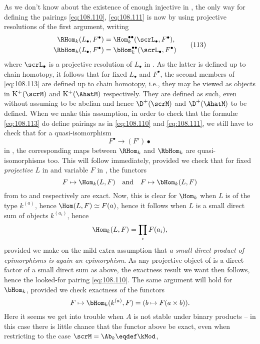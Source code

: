As we don't know about the existence of enough injective
in \AhatM, the only way for defining the pairings \eqref{eq:108.110},
\eqref{eq:108.111} is now by using projective resolutions of the first
argument, writing
\begin{equation}
  \label{eq:108.113}
  \begin{aligned}
    \RHom_k(L_\bullet,F^\bullet) &=
    \Hom_k^{\bullet\bullet}(\scrL_\bullet,F^\bullet), \\
    \RbHom_k(L_\bullet,F^\bullet) &=
    \bHom_k^{\bullet\bullet}(\scrL_\bullet,F^\bullet) 
  \end{aligned}\tag{113}
\end{equation}
where $\scrL_\bullet$ is a projective resolution of $L_\bullet$ in
\Ahatk. As the latter is defined up to chain homotopy, it follows that
for fixed $L_\bullet$ and $F^\bullet$, the second members of
\eqref{eq:108.113} are defined up to chain homotopy, i.e., they may be
viewed as objects in $\mathrm K^+(\scrM)$ and $\mathrm K^+(\AhatM)$
respectively. They are defined as such, even without assuming \scrM{}
to be abelian and hence $\D^+(\scrM)$ and $\D^+(\AhatM)$ to be
defined. When we make this assumption, in order to check that the
formulæ \eqref{eq:108.113} do define pairings as in \eqref{eq:108.110}
and \eqref{eq:108.111}, we still have to check that for a
quasi-isomorphism
\[F^\bullet\to (F')\bullet\]
in \AhatM, the corresponding maps between $\RHom_k$ and $\RbHom_k$ are
quasi-isomorphisms too. This will follow immediately, provided we
check that for fixed \emph{projective} $L$ in \Ahatk{} and variable
$F$ in \AhatM, the functors
\[F\mapsto\Hom_k(L,F)\quad\text{and}\quad
F\mapsto\bHom_k(L,F)\]
from \AhatM{} to \scrM{} and \AhatM{} respectively are exact. Now,
this is clear for $\Hom_k$ when $L$ is of the type $k^{(a)}$, hence
$\Hom(L,F)\simeq F(a)$, hence it follows when $L$ is a small direct
sum of objects $k^{(a_i)}$, hence
\[\Hom_k(L,F) = \prod_i F(a_i),\]
provided we make on \scrM{} the mild extra assumption that \emph{a
  small direct product of epimorphisms is again an epimorphism}. As
any projective object of \Ahatk{} is a direct factor of a small direct
sum as above, the exactness result we want then follows, hence the
looked-for pairing \eqref{eq:108.110}. The same argument will hold for
$\bHom_k$, provided we check exactness of the functors
\[F\mapsto \bHom_k(k^{(a)},F)=(b\mapsto F(a\times b)).\]
Here it seems we get into trouble when $A$ is not stable under binary
products -- in this case there is little chance that the functor above
be exact, even when restricting to the case $\scrM=\Ab_k \eqdef\kMod$,
